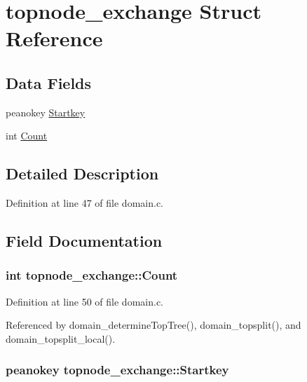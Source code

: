 \hypertarget{structtopnode__exchange}{\section{topnode\-\_\-exchange \-Struct \-Reference}
\label{structtopnode__exchange}
}
\subsection*{\-Data \-Fields}
\begin{DoxyCompactItemize}
\item 
peanokey \hyperlink{structtopnode__exchange_a1320a6ec4ba632909af0c092bd7735b4}{\-Startkey}
\item 
int \hyperlink{structtopnode__exchange_a8c37f88a4fac1e60c0132abfc976ce70}{\-Count}
\end{DoxyCompactItemize}


\subsection{\-Detailed \-Description}


\-Definition at line 47 of file domain.\-c.



\subsection{\-Field \-Documentation}
\hypertarget{structtopnode__exchange_a8c37f88a4fac1e60c0132abfc976ce70}{
\subsubsection[{\-Count}]{\setlength{\rightskip}{0pt plus 5cm}int {\bf topnode\-\_\-exchange\-::\-Count}}}\label{structtopnode__exchange_a8c37f88a4fac1e60c0132abfc976ce70}


\-Definition at line 50 of file domain.\-c.



\-Referenced by domain\-\_\-determine\-Top\-Tree(), domain\-\_\-topsplit(), and domain\-\_\-topsplit\-\_\-local().

\hypertarget{structtopnode__exchange_a1320a6ec4ba632909af0c092bd7735b4}{
\subsubsection[{\-Startkey}]{\setlength{\rightskip}{0pt plus 5cm}peanokey {\bf topnode\-\_\-exchange\-::\-Startkey}}}\label{structtopnode__exchange_a1320a6ec4ba632909af0c092bd7735b4}


